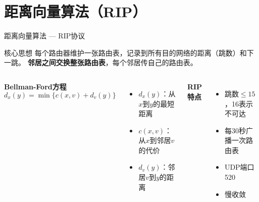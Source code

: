 \documentclass[10pt, aspectratio=169]{beamer}
\begin{document}
\section{距离向量算法（RIP）}
\begin{frame}{距离向量算法 --- RIP协议}
    \begin{block}{核心思想}
        每个路由器维护一张路由表，记录到所有目的网络的距离（跳数）和下一跳。
        \textbf{邻居之间交换整张路由表}，每个邻居传自己的路由表。
    \end{block}
    \vspace{0.3em}
    \begin{columns}[t]
        \textbf{Bellman-Ford方程}
        \[
        d_x(y) = \min\{c(x,v) + d_v(y)\}
        \]
        \begin{itemize}
            \item $d_x(y)$：从$x$到$y$的最短距离
            \item $c(x,v)$：从$x$到邻居$v$的代价
            \item $d_v(y)$：邻居$v$到$y$的距离
        \end{itemize}
        \textbf{RIP特点}
        \begin{itemize}
            \item 跳数$\le 15$，16表示不可达
            \item 每30秒广播一次路由表
            \item UDP端口520
            \item 慢收敛
        \end{itemize}
    \end{columns}
\end{frame}
\end{document}
